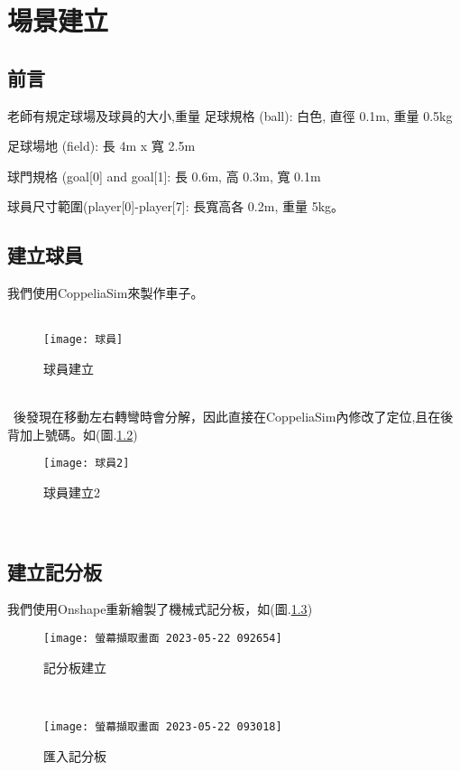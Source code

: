 \chapter{場景建立}
\section{前言}
老師有規定球場及球員的大小,重量
足球規格 (ball): 白色, 直徑 0.1m, 重量 0.5kg

足球場地 (field): 長 4m x 寬 2.5m

球門規格 (goal[0] and goal[1]: 長 0.6m, 高 0.3m, 寬 0.1m

球員尺寸範圍(player[0]-player[7]: 長寬高各 0.2m, 重量 5kg。\\
\section{建立球員}
我們使用CoppeliaSim來製作車子。\\
\
\begin{figure}[hbt!]
\begin{center}
\texttt{[image: 球員]}
\caption{\Large 球員建立}\label{球員建立}
\end{center}
\end{figure}
\\
\
後發現在移動左右轉彎時會分解，因此直接在CoppeliaSim內修改了定位,且在後背加上號碼。如(圖.\ref{球員建立2})\\

\begin{figure}[hbt!]
\begin{center}
\texttt{[image: 球員2]}
\caption{\Large 球員建立2}\label{球員建立2}
\end{center}
\end{figure}\
\section{建立記分板}
我們使用Onshape重新繪製了機械式記分板，如(圖.\ref{記分板建立})\\
\begin{figure}[hbt!]
\begin{center}
\texttt{[image: 螢幕擷取畫面 2023-05-22 092654]}
\caption{\Large 記分板建立}\label{記分板建立}
\end{center}
\end{figure}\
\begin{figure}[hbt!]
\begin{center}
\texttt{[image: 螢幕擷取畫面 2023-05-22 093018]}
\caption{\Large 匯入記分板}\label{匯入記分板}
\end{center}
\end{figure}\
\newpage
